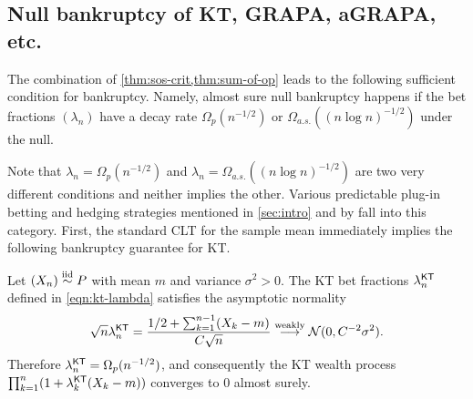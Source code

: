 \subsection{Null bankruptcy of KT, GRAPA, aGRAPA, etc.} \label{sec:bankrupt-pred}

The combination of \cref{thm:sos-crit,thm:sum-of-op} leads to the following sufficient condition for bankruptcy. Namely, almost sure null bankruptcy happens if the bet fractions $(\lambda_n)$ have a decay rate $\Omega_p(n^{-1/2})$ or $\Omega_{a.s.}((n\log n)^{-1/2})$ under the null.

Note that
$\lambda_n = \Omega_p(n^{-1/2})$ and $\lambda_n = \Omega_{a.s.}((n\log n)^{-1/2})$ are two very different conditions and neither implies the other.
Various predictable plug-in betting and hedging strategies mentioned in \cref{sec:intro} and by \cite{waudby2024estimating} fall into this category. First, the standard CLT for the sample mean immediately implies the following bankruptcy guarantee for KT.
\begin{proposition} Let $(X_n)\overset{\mathrm{iid}}{\sim} P$ with mean $m$ and variance $\sigma^2 > 0$. The KT bet fractions $\lambda^{\mathsf{KT}}_n$ defined in \eqref{eqn:kt-lambda} satisfies the asymptotic normality
    \begin{equation}\label{eqn:kt-lambda-clt}
   \sqrt{n} \lambda^{\mathsf{KT}}_n = \frac{1/2+\sum_{k=1}^{n-1}(X_k - m)}{C \sqrt{n}} \stackrel{\text{weakly}}{\longrightarrow} \mathcal{N}(0,C^{-2}\sigma^2).
\end{equation}
Therefore $\lambda^{\mathsf{KT}}_n = \Omega_p(n^{-1/2})$, and consequently the KT wealth process $\prod_{k=1}^n(1+\lambda^{\mathsf{KT}}_k(X_k - m))$ converges to 0 almost surely.
\end{proposition}

